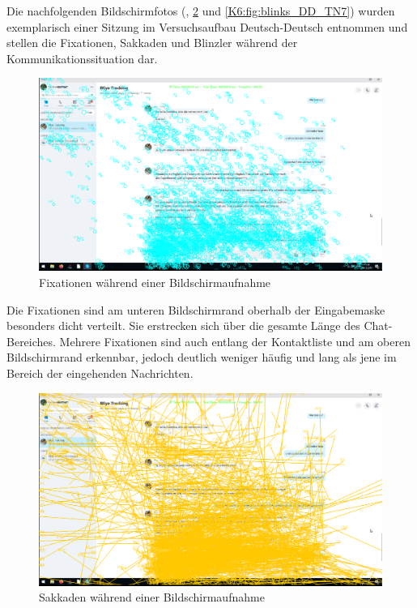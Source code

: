 Die nachfolgenden Bildschirmfotos (, \ref{K6:fig:sacmove-DD_TN7} und \ref{K6:fig:blinks_DD_TN7}) wurden exemplarisch einer Sitzung im Versuchsaufbau Deutsch-Deutsch entnommen und stellen die Fixationen, Sakkaden und Blinzler während der Kommunikationssituation dar.


\begin{figure}
    \includegraphics[width=\textwidth]{Figures/Fixmaps/DeDe/Overlay_Image_DD_TN7_Trial_1_Fixations}
	\caption{Fixationen während einer Bildschirmaufnahme}
    \label{K6:fig:fixations-DD_TN7}
\end{figure}



Die Fixationen sind am unteren Bildschirmrand oberhalb der Eingabemaske besonders dicht verteilt. Sie erstrecken sich über die gesamte Länge des Chat-Bereiches. Mehrere Fixationen sind auch entlang der Kontaktliste und am oberen Bildschirmrand erkennbar, jedoch deutlich weniger häufig und lang als jene im Bereich der eingehenden Nachrichten.


\begin{figure}
    \includegraphics[width=\textwidth]{Figures/Fixmaps/DeDe/Overlay_Image_DD_TN7_Trial_1_Saccades}
	\caption{Sakkaden während einer Bildschirmaufnahme}
    \label{K6:fig:sacmove-DD_TN7}
\end{figure}


